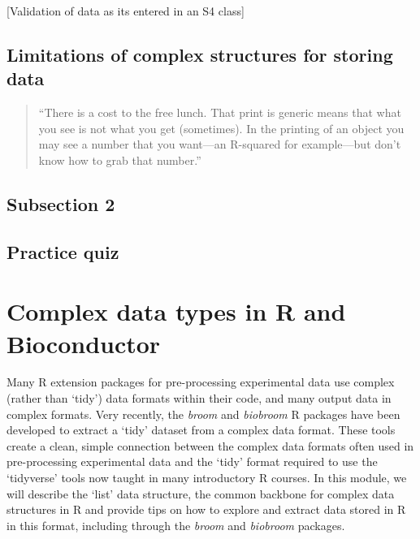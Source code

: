 \documentclass[]{tufte-book}
\begin{document}
{[}Validation of data as its entered in an S4 class{]}

\hypertarget{limitations-of-complex-structures-for-storing-data}{%
\subsection{Limitations of complex structures for storing data}\label{limitations-of-complex-structures-for-storing-data}}

\begin{quote}
``There is a cost to the free lunch. That print is generic means that what
you see is not what you get (sometimes). In the printing of an object you may
see a number that you want---an R-squared for example---but don't know how
to grab that number.'' \citep{burns2011r}
\end{quote}

\hypertarget{subsection-2-5}{%
\subsection{Subsection 2}\label{subsection-2-5}}

\hypertarget{practice-quiz-3}{%
\subsection{Practice quiz}\label{practice-quiz-3}}

\hypertarget{complex-data-types-in-r-and-bioconductor}{%
\section{Complex data types in R and Bioconductor}\label{complex-data-types-in-r-and-bioconductor}}

Many R extension packages for pre-processing experimental data use complex
(rather than `tidy') data formats within their code, and many output data in
complex formats. Very recently, the \emph{broom} and \emph{biobroom} R
packages have been developed to extract a `tidy' dataset from a complex data
format. These tools create a clean, simple connection between the complex data
formats often used in pre-processing experimental data and the `tidy' format
required to use the `tidyverse' tools now taught in many introductory R courses.
In this module, we will describe the `list' data structure, the common backbone
for complex data structures in R and provide tips on how to explore and extract
data stored in R in this format, including through the \emph{broom} and
\emph{biobroom} packages.
\end{document}
